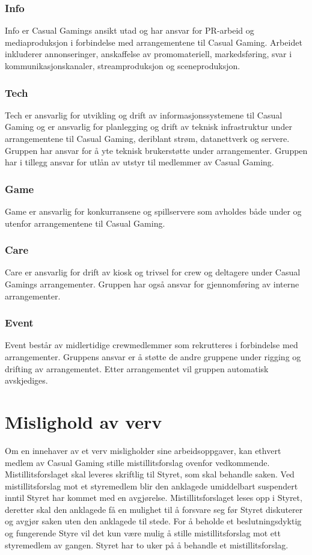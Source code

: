 \subsubsection{Info}
Info er Casual Gamings ansikt utad og har ansvar for PR-arbeid og mediaproduksjon i forbindelse med arrangementene til Casual Gaming. Arbeidet inkluderer annonseringer, anskaffelse av promomateriell, markedsføring, svar i kommunikasjonskanaler, streamproduksjon og sceneproduksjon.

\subsubsection{Tech}
Tech er ansvarlig for utvikling og drift av informasjonssystemene til Casual Gaming og er ansvarlig for planlegging og drift av teknisk infrastruktur under arrangementene til Casual Gaming, deriblant strøm, datanettverk og servere. Gruppen har ansvar for å yte teknisk brukerstøtte under arrangementer. Gruppen har i tillegg ansvar for utlån av utstyr til medlemmer av Casual Gaming.

\subsubsection{Game}
Game er ansvarlig for konkurransene og spillservere som avholdes både under og utenfor arrangementene til Casual Gaming.

\subsubsection{Care}
Care er ansvarlig for drift av kiosk og trivsel for crew og deltagere under Casual Gamings arrangementer. Gruppen har også ansvar for gjennomføring av interne arrangementer.

\subsubsection{Event}
Event består av midlertidige crewmedlemmer som rekrutteres i forbindelse med arrangementer. Gruppens ansvar er å støtte de andre gruppene under rigging og drifting av arrangementet. Etter arrangementet vil gruppen automatisk avskjediges.

\section{Mislighold av verv}
Om en innehaver av et verv misligholder sine arbeidsoppgaver, kan ethvert medlem av Casual Gaming stille mistillitsforslag ovenfor vedkommende. Mistillitsforslaget skal leveres skriftlig til Styret, som skal behandle saken. Ved mistillitsforslag mot et styremedlem blir den anklagede umiddelbart suspendert inntil Styret har kommet med en avgjørelse. Mistillitsforslaget leses opp i Styret, deretter skal den anklagede få en mulighet til å forsvare seg før Styret diskuterer og avgjør saken uten den anklagede til stede. For å beholde et beslutningsdyktig og fungerende Styre vil det kun være mulig å stille mistillitsforslag mot ett styremedlem av gangen. Styret har to uker på å behandle et mistillitsforslag.
